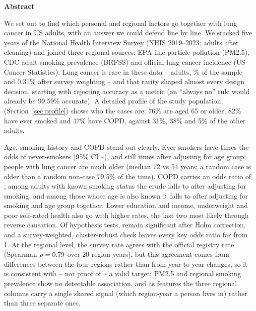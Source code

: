 \begin{center}
{\large\bfseries Abstract}
\end{center}

\noindent We set out to find which personal and regional factors go together with lung cancer in US adults, with an answer we could defend line by line. We stacked five years of the National Health Interview Survey (NHIS 2019--2023; \nAdults adults after cleaning) and joined three regional sources: EPA fine-particle pollution (PM2.5), CDC adult smoking prevalence (BRFSS) and official lung-cancer incidence (US Cancer Statistics). Lung cancer is rare in these data -- \nCases adults, \sampleRate\% of the sample and 0.31\% after survey weighting -- and that rarity shaped almost every design decision, starting with rejecting accuracy as a metric (an ``always no'' rule would already be 99.59\% accurate). A detailed profile of the study population (Section~\ref{sec:profile}) shows who the cases are: 76\% are aged 65 or older, 82\% have ever smoked and 47\% have COPD, against 31\%, 38\% and 5\% of the other adults.

Age, smoking history and COPD stand out clearly. Ever-smokers have \orSmoking times the odds of never-smokers (95\% CI \orSmokingLo--\orSmokingHi), and still \orSmokingMH times after adjusting for age group; people with lung cancer are much older (median 72 vs 54 years; a random case is older than a random non-case 79.5\% of the time). COPD carries an odds ratio of \orCOPD; among adults with known smoking status the crude \orCOPDcrude falls to \orCOPDsmoking after adjusting for smoking, and among those whose age is also known it falls to \orCOPDsmokingAge after adjusting for smoking and age group together. Lower education and income, underweight and poor self-rated health also go with higher rates, the last two most likely through reverse causation. Of \nTests hypothesis tests, \nSignificant remain significant after Holm correction, and a survey-weighted, cluster-robust check leaves every key odds ratio far from 1. At the regional level, the survey rate agrees with the official registry rate (Spearman $\rho = 0.79$ over 20 region-years), but this agreement comes from differences between the four regions rather than from year-to-year changes, so it is consistent with -- not proof of -- a valid target; PM2.5 and regional smoking prevalence show no detectable association, and as features the three regional columns carry a single shared signal (which region-year a person lives in) rather than three separate ones.

